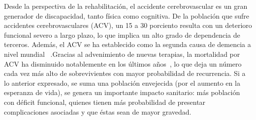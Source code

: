 \begin{introduction}
    Desde la perspectiva de la rehabilitación, el accidente cerebrovascular 
    es un gran generador de discapacidad, tanto física como cognitiva. De la población que sufre 
    accidentes cerebrovasculares (ACV), un 15 a 30 porciento resulta con un deterioro funcional severo a 
    largo plazo, lo que implica un alto grado de dependencia de terceros. Además, el ACV se ha
    establecido como la segunda causa de demencia a nivel mundial~\cite{moyano2010accidente} .Gracias 
    al advenimiento de nuevas terapias, la mortalidad por ACV ha disminuido notablemente en los últimos 
    años~\cite{cuadrado2009rehabilitacion,harold2007guidelines}, lo que deja un número cada vez más 
    alto de sobrevivientes con mayor probabilidad de recurrencia. Si a lo anterior expresado, se suma una población 
    envejecida (por el aumento en la esperanza de vida), se genera un importante impacto sanitario: 
    más población con déficit funcional, quienes tienen más probabilidad de presentar complicaciones 
    asociadas y que éstas sean de mayor gravedad.


\end{introduction}
